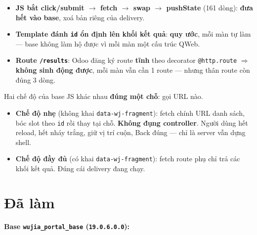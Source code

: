 \begin{itemize}
  \item \textbf{JS bắt click/submit $\to$ fetch $\to$ swap $\to$ pushState} (161 dòng):
    \textbf{đưa hết vào base}, xoá bản riêng của delivery.
  \item \textbf{Template đánh \texttt{id} ổn định lên khối kết quả}: \textbf{quy ước}, mỗi màn
    tự làm --- base không làm hộ được vì mỗi màn một cấu trúc QWeb.
  \item \textbf{Route \texttt{/results}}: Odoo đăng ký route \textbf{tĩnh} theo decorator
    \texttt{@http.route} $\Rightarrow$ \textbf{không sinh động được}, mỗi màn vẫn cần 1 route ---
    nhưng thân route còn đúng 3 dòng.
\end{itemize}

Hai chế độ của base JS khác nhau \textbf{đúng một chỗ}: gọi URL nào.

\begin{itemize}
  \item \textbf{Chế độ nhẹ} (không khai \texttt{data-wj-fragment}): fetch chính URL danh sách,
    bóc slot theo \texttt{id} rồi thay tại chỗ. \textbf{Không đụng controller}. Người dùng hết
    reload, hết nháy trắng, giữ vị trí cuộn, Back đúng --- chỉ là server vẫn dựng shell.
  \item \textbf{Chế độ đầy đủ} (có khai \texttt{data-wj-fragment}): fetch route phụ chỉ trả các
    khối kết quả. Đúng cái delivery đang chạy.
\end{itemize}

\section{Đã làm}

\textbf{Base \texttt{wujia\_portal\_base} (\texttt{19.0.6.0.0}):}

